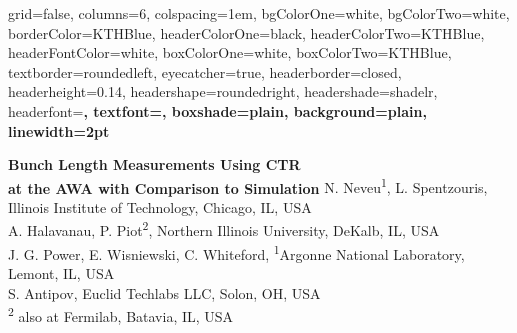 \documentclass[portrait,final,paperwidth=120cm, paperheight=240cm,  fontscale=0.277]{baposter}
\begin{document}
\begin{poster}{
	grid=false,
	columns=6,
	colspacing=1em,
	bgColorOne=white,
	bgColorTwo=white,
	borderColor=KTHBlue,
	headerColorOne=black,
	headerColorTwo=KTHBlue,
	headerFontColor=white,
	boxColorOne=white,
	boxColorTwo=KTHBlue,
	textborder=roundedleft,
	eyecatcher=true,
	headerborder=closed,
	headerheight=0.14\textheight,
	headershape=roundedright,
	headershade=shadelr,
	headerfont=\Large\bf\textsc, %
	textfont={\setlength{\parindent}{0em}},
	boxshade=plain,
	background=plain,
	linewidth=2pt
}
{
	
	 }
{\bf{Bunch Length Measurements Using CTR \\
		at the AWA with Comparison to Simulation}}%
{\vspace{1em}
	N. Neveu\textsuperscript{1}, L. Spentzouris, Illinois Institute of Technology, Chicago, IL, USA \\
	A. Halavanau, P. Piot\textsuperscript{2}, Northern Illinois University, DeKalb, IL, USA \\
	J. G. Power, E. Wisniewski, C. Whiteford, \textsuperscript{1}Argonne National  Laboratory, Lemont, IL, USA \\
	S. Antipov, Euclid Techlabs LLC, Solon, OH, USA \\
	\textsuperscript{2} also at Fermilab, Batavia, IL, USA \\
    }
{%

}




\end{poster}
\end{document}
